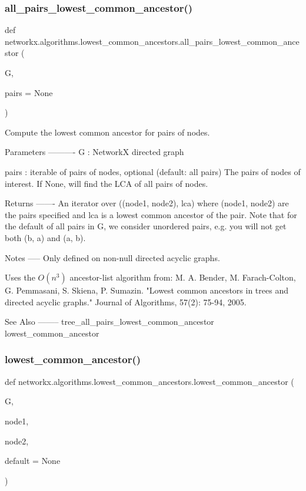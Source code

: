 \subsubsection{\texorpdfstring{all\+\_\+pairs\+\_\+lowest\+\_\+common\+\_\+ancestor()}{all\_pairs\_lowest\_common\_ancestor()}}
{\footnotesize\ttfamily def networkx.\+algorithms.\+lowest\+\_\+common\+\_\+ancestors.\+all\+\_\+pairs\+\_\+lowest\+\_\+common\+\_\+ancestor (\begin{DoxyParamCaption}\item[{}]{G,  }\item[{}]{pairs = {\ttfamily None} }\end{DoxyParamCaption})}

\begin{DoxyVerb}Compute the lowest common ancestor for pairs of nodes.

Parameters
----------
G : NetworkX directed graph

pairs : iterable of pairs of nodes, optional (default: all pairs)
    The pairs of nodes of interest.
    If None, will find the LCA of all pairs of nodes.

Returns
-------
An iterator over ((node1, node2), lca) where (node1, node2) are
the pairs specified and lca is a lowest common ancestor of the pair.
Note that for the default of all pairs in G, we consider
unordered pairs, e.g. you will not get both (b, a) and (a, b).

Notes
-----
Only defined on non-null directed acyclic graphs.

Uses the $O(n^3)$ ancestor-list algorithm from:
M. A. Bender, M. Farach-Colton, G. Pemmasani, S. Skiena, P. Sumazin.
"Lowest common ancestors in trees and directed acyclic graphs."
Journal of Algorithms, 57(2): 75-94, 2005.

See Also
--------
tree_all_pairs_lowest_common_ancestor
lowest_common_ancestor
\end{DoxyVerb}
 \mbox{\label{namespacenetworkx_1_1algorithms_1_1lowest__common__ancestors_aac710fb1ce420562a02fa807a6b42520}} 
\subsubsection{\texorpdfstring{lowest\+\_\+common\+\_\+ancestor()}{lowest\_common\_ancestor()}}
{\footnotesize\ttfamily def networkx.\+algorithms.\+lowest\+\_\+common\+\_\+ancestors.\+lowest\+\_\+common\+\_\+ancestor (\begin{DoxyParamCaption}\item[{}]{G,  }\item[{}]{node1,  }\item[{}]{node2,  }\item[{}]{default = {\ttfamily None} }\end{DoxyParamCaption})}

